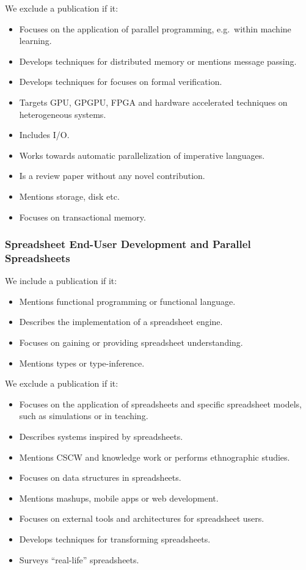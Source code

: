 \documentclass[a4paper]{article}
\begin{document}
We exclude a publication if it:

\begin{itemize}
\item Focuses on the application of parallel programming, e.g.\ within
  machine learning.
\item Develops techniques for distributed memory or mentions message
  passing.
\item Develops techniques for focuses on formal verification.
\item Targets GPU, GPGPU, FPGA and hardware accelerated techniques on
  heterogeneous systems.
\item Includes I/O.
\item Works towards automatic parallelization of imperative languages.
\item Is a review paper without any novel contribution.
\item Mentions storage, disk etc.
\item Focuses on transactional memory.
\end{itemize}

\subsubsection{Spreadsheet End-User Development and Parallel Spreadsheets}

We include a publication if it:

\begin{itemize}
\item Mentions functional programming or functional language.
\item Describes the implementation of a spreadsheet engine.
\item Focuses on gaining or providing spreadsheet understanding.
\item Mentions types or type-inference.
\end{itemize}

We exclude a publication if it:

\begin{itemize}
\item Focuses on the application of spreadsheets and specific
  spreadsheet models, such as simulations or in teaching.
\item Describes systems inspired by spreadsheets.
\item Mentions CSCW and knowledge work or performs ethnographic
  studies.
\item Focuses on data structures in spreadsheets.
\item Mentions mashups, mobile apps or web development.
\item Focuses on external tools and architectures for spreadsheet
  users.
\item Develops techniques for transforming spreadsheets.
\item Surveys ``real-life'' spreadsheets.
\end{itemize}
\end{document}
